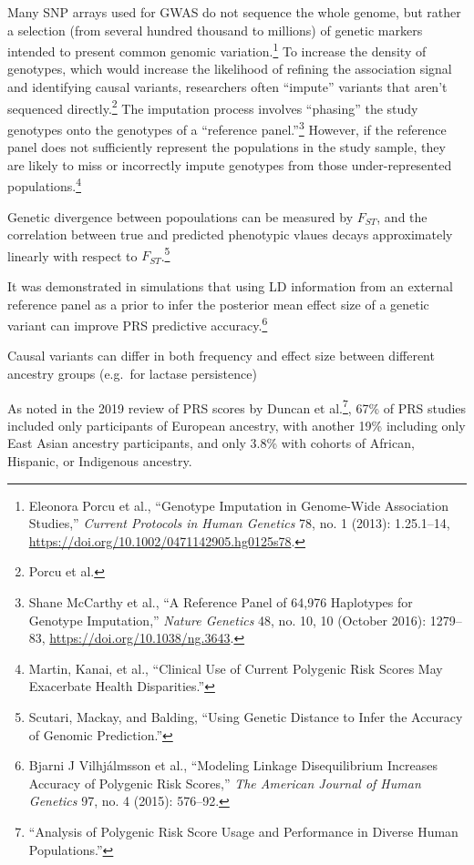 \documentclass[
  9pt,
]{book}
\begin{document}
Many SNP arrays used for GWAS do not sequence the whole genome, but rather a selection (from several hundred thousand to millions) of genetic markers intended to present common genomic variation.\footnote{Eleonora Porcu et al., {``Genotype {Imputation} in {Genome-Wide Association Studies},''} \emph{Current Protocols in Human Genetics} 78, no. 1 (2013): 1.25.1--14, \url{https://doi.org/10.1002/0471142905.hg0125s78}.} To increase the density of genotypes, which would increase the likelihood of refining the association signal and identifying causal variants, researchers often ``impute'' variants that aren't sequenced directly.\footnote{Porcu et al.} The imputation process involves ``phasing'' the study genotypes onto the genotypes of a ``reference panel.''\footnote{Shane McCarthy et al., {``A Reference Panel of 64,976 Haplotypes for Genotype Imputation,''} \emph{Nature Genetics} 48, no. 10, 10 (October 2016): 1279--83, \url{https://doi.org/10.1038/ng.3643}.} However, if the reference panel does not sufficiently represent the populations in the study sample, they are likely to miss or incorrectly impute genotypes from those under-represented populations.\footnote{Martin, Kanai, et al., {``Clinical Use of Current Polygenic Risk Scores May Exacerbate Health Disparities.''}}

Genetic divergence between popoulations can be measured by \(F_{ST}\), and the correlation between true and predicted phenotypic vlaues decays approximately linearly with respect to \(F_{ST}\).\footnote{Scutari, Mackay, and Balding, {``Using {Genetic Distance} to {Infer} the {Accuracy} of {Genomic Prediction}.''}}

It was demonstrated in simulations that using LD information from an external reference panel as a prior to infer the posterior mean effect size of a genetic variant can improve PRS predictive accuracy.\footnote{Bjarni J Vilhjálmsson et al., {``Modeling Linkage Disequilibrium Increases Accuracy of Polygenic Risk Scores,''} \emph{The American Journal of Human Genetics} 97, no. 4 (2015): 576--92.}

Causal variants can differ in both frequency and effect size between different ancestry groups (e.g.~for lactase persistence)

As noted in the 2019 review of PRS scores by Duncan et al.\footnote{{``Analysis of Polygenic Risk Score Usage and Performance in Diverse Human Populations.''}}, 67\% of PRS studies included only participants of European ancestry, with another 19\% including only East Asian ancestry participants, and only 3.8\% with cohorts of African, Hispanic, or Indigenous ancestry.
\end{document}
